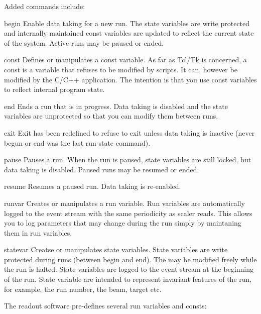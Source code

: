       Added commands include:
      \begin{description}
	 \item{begin}  Enable data taking for a new run.  The  state variables
	    are write protected and internally maintained const variables are 
	    updated to reflect the current state of the system. Active runs
	    may be paused or ended.
	 \item{const} Defines or manipulates a const variable.  As far as Tcl/Tk is
	    concerned, a  const is a variable that refuses to be modified by 
	    scripts. It can, however be modified by the C/C++ application.  The
	    intention is that you use const variables to reflect internal program
	    state.
	 \item{end} Ends a run that is in progress.  Data taking is disabled and
	    the state variables are unprotected so that you can modify them
	    between runs.
	 \item{exit} Exit has been redefined to refuse to exit unless 
	    data taking is inactive (never begun or end was the last run
	    state command).
	 \item{pause} Pauses a run.  When the run is paused, state variables
	    are still locked, but data taking is disabled. Paused runs may be
	    resumed or ended.
	 \item{resume} Resumes a paused run.  Data taking is re-enabled.
	 \item{runvar} Creates or manipulates a run variable.  Run variables 
	    are automatically logged to the event stream with the same
	    periodicity as scaler reads.  This allows you to log parameters
	    that may change during the run simply by maintaning them in 
	    run variables.
	 \item{statevar} Creatse or manipulates state variables.  State
	    variables are write protected during runs (between begin and end).
	    The may be modified freely while the run is halted.  State
	    variables are logged to the event stream at the beginning of
	    the run.  State variable are intended to represent invariant
	    features of the run, for example, the run number, the beam, target
	    etc.
      \end{description}
      
      The readout software pre-defines several run variables and consts:
      
